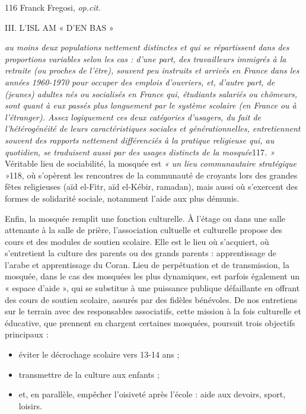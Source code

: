 116 Franck Fregosi, \emph{op.cit.}

III. L'ISL AM « D'EN BAS »

\emph{au moins deux populations nettement distinctes et qui se
répartissent dans des proportions variables selon les cas : d'une part,
des travailleurs immigrés à la retraite (ou proches de l'être), souvent
peu instruits et arrivés en France dans les années 1960-1970 pour
occuper des emplois d'ouvriers, et, d'autre part, de (jeunes) adultes
nés ou socialisés en France qui, étudiants salariés ou chômeurs, sont
quant à eux passés plus longuement par le système scolaire (en France ou
à l'étranger). Assez logiquement ces deux catégories d'usagers, du fait
de l'hétérogénéité de leurs caractéristiques sociales et
générationnelles, entretiennent souvent des rapports nettement
différenciés à la pratique religieuse qui, au quotidien, se traduisent
aussi par des usages distincts de la mosquée}117\emph{. »} Véritable
lieu de sociabilité, la mosquée est \emph{« un lieu communautaire
stratégique »}118, où s'opèrent les rencontres de la communauté de
croyants lors des grandes fêtes religieuses (aïd el-Fitr, aïd el-Kébir,
ramadan), mais aussi où s'exercent des formes de solidarité sociale,
notamment l'aide aux plus démunis.

Enfin, la mosquée remplit une fonction culturelle. À l'étage ou dans une
salle attenante à la salle de prière, l'association cultuelle et
culturelle propose des cours et des modules de soutien scolaire. Elle
est le lieu où s'acquiert, où s'entretient la culture des parents ou des
grands parents : apprentissage de l'arabe et apprentissage du Coran.
Lieu de perpétuation et de transmission, la mosquée, dans le cas des
mosquées les plus dynamiques, est parfois également un « espace d'aide
», qui se substitue à une puissance publique défaillante en offrant des
cours de soutien scolaire, assurés par des fidèles bénévoles. De nos
entretiens sur le terrain avec des responsables associatifs, cette
mission à la fois culturelle et éducative, que prennent en chargent
certaines mosquées, poursuit trois objectifs principaux :


\begin{itemize}
\item
  éviter le décrochage scolaire vers 13-14 ans ;
\item
  transmettre de la culture aux enfants ;
\item
  
  et, en parallèle, empêcher l'oisiveté après l'école : aide aux
  devoirs, sport, loisirs.
  
\end{itemize}


